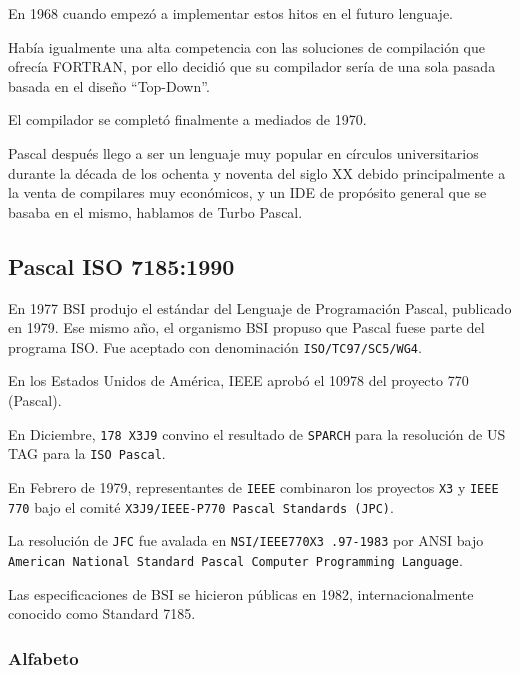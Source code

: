 En 1968 cuando empezó a implementar estos hitos en el futuro lenguaje.


Había igualmente una alta competencia con las soluciones de compilación que
ofrecía FORTRAN, por ello decidió que su compilador sería de una sola
pasada
basada en el diseño ``Top-Down''.


El compilador se completó finalmente a mediados de 1970.



Pascal después llego a ser un lenguaje muy popular en círculos
universitarios durante la década de los ochenta y noventa del siglo XX debido
principalmente a la venta de compilares muy económicos, y un IDE de
propósito general que se basaba en el mismo, hablamos de Turbo Pascal.

\subsection{Pascal ISO 7185:1990}
En 1977 BSI
\cite{article/iso/piso7185}
produjo el estándar del Lenguaje de
Programación Pascal, publicado en 1979. Ese mismo año, el
organismo
BSI propuso
que Pascal fuese parte del programa ISO. Fue aceptado con
denominación \texttt{ISO/TC97/SC5/WG4}. 

En los Estados Unidos de América, IEEE aprobó el 10978 del proyecto 770
(Pascal).


En Diciembre, \texttt{178 X3J9} convino el resultado de
\texttt{SPARCH} para la resolución de US
TAG
para la \texttt{ISO Pascal}.

En Febrero de 1979, representantes de \texttt{IEEE} combinaron los proyectos
\texttt{X3} y \texttt{IEEE 770}
bajo el comité \texttt{X3J9/IEEE-P770 Pascal Standards (JPC)}.

La resolución de \texttt{JFC} fue avalada en \texttt{NSI/IEEE770X3 .97-1983} por
ANSI
bajo \texttt{American National Standard Pascal Computer Programming Language}.

Las especificaciones de BSI se hicieron públicas en 1982, internacionalmente conocido como
Standard 7185.

\subsubsection{Alfabeto}

